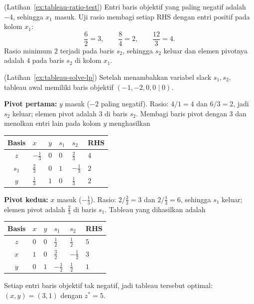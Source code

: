 \begin{solution}(Latihan~\ref{ex:tableau-ratio-test})
Entri baris objektif yang paling negatif adalah $-4$, sehingga $x_1$ masuk.
Uji rasio membagi setiap RHS dengan entri positif pada kolom $x_1$:
\[
\frac{6}{2} = 3, \qquad \frac{8}{4} = 2, \qquad \frac{12}{3} = 4.
\]
Rasio minimum $2$ terjadi pada baris $s_2$, sehingga $s_2$ keluar dan elemen
pivotnya adalah $4$ pada baris $s_2$ di kolom $x_1$.
\end{solution}

\begin{solution}(Latihan~\ref{ex:tableau-solve-lp})
Setelah menambahkan variabel slack $s_1, s_2$, tableau awal memiliki baris objektif $(-1, -2, 0, 0 \mid 0)$.

\textbf{Pivot pertama:} $y$ masuk ($-2$ paling negatif). Rasio: $4/1 = 4$ dan $6/3 = 2$, jadi $s_2$ keluar; elemen pivot adalah $3$ di baris $s_2$. Membagi baris pivot dengan $3$ dan menolkan entri lain pada kolom $y$ menghasilkan
\begin{center}
\renewcommand{\arraystretch}{1.3}
\begin{tabular}{c|ZZZZ|Z}
\toprule
Basis & $x$ & $y$ & $s_1$ & $s_2$ & RHS\\
\midrule
$z$   & $-\tfrac13$ & $0$ & $0$ & $\tfrac23$ & $4$\\
\midrule
$s_1$ & $\tfrac23$ & $0$ & $1$ & $-\tfrac13$ & $2$\\
$y$   & $\tfrac13$ & $1$ & $0$ & $\tfrac13$  & $2$\\
\bottomrule
\end{tabular}
\end{center}

\textbf{Pivot kedua:} $x$ masuk ($-\tfrac13$). Rasio: $2/\tfrac23 = 3$ dan $2/\tfrac13 = 6$, sehingga $s_1$ keluar; elemen pivot adalah $\tfrac23$ di baris $s_1$. Tableau yang dihasilkan adalah
\begin{center}
\renewcommand{\arraystretch}{1.3}
\begin{tabular}{c|ZZZZ|Z}
\toprule
Basis & $x$ & $y$ & $s_1$ & $s_2$ & RHS\\
\midrule
$z$   & $0$ & $0$ & $\tfrac12$ & $\tfrac12$ & $5$\\
\midrule
$x$ & $1$ & $0$ & $\tfrac32$ & $-\tfrac12$ & $3$\\
$y$ & $0$ & $1$ & $-\tfrac12$ & $\tfrac12$ & $1$\\
\bottomrule
\end{tabular}
\end{center}
Setiap entri baris objektif tak negatif, jadi tableau tersebut optimal: $(x, y) = (3, 1)$ dengan $z^* = 5$.
\end{solution}

